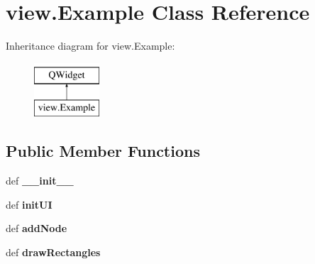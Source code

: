 \hypertarget{classview_1_1Example}{\section{view.\-Example Class Reference}
\label{classview_1_1Example}
}
Inheritance diagram for view.\-Example\-:\begin{figure}[H]
\begin{center}
\leavevmode
\includegraphics[height=2.000000cm]{classview_1_1Example}
\end{center}
\end{figure}
\subsection*{Public Member Functions}
\begin{DoxyCompactItemize}
\item 
\hypertarget{classview_1_1Example_ab71d851c4701b16b75f5b07d7e299dbd}{def {\bfseries \-\_\-\-\_\-init\-\_\-\-\_\-}}\label{classview_1_1Example_ab71d851c4701b16b75f5b07d7e299dbd}

\item 
\hypertarget{classview_1_1Example_a18cfda95cbf601790d1020c3bf3f83fb}{def {\bfseries init\-U\-I}}\label{classview_1_1Example_a18cfda95cbf601790d1020c3bf3f83fb}

\item 
\hypertarget{classview_1_1Example_ae4f51d4c6190cf041a32f5ef47a02912}{def {\bfseries add\-Node}}\label{classview_1_1Example_ae4f51d4c6190cf041a32f5ef47a02912}

\item 
\hypertarget{classview_1_1Example_a09ecb51e66e624bcf7453e54aecea55d}{def {\bfseries draw\-Rectangles}}\label{classview_1_1Example_a09ecb51e66e624bcf7453e54aecea55d}

\end{DoxyCompactItemize}
